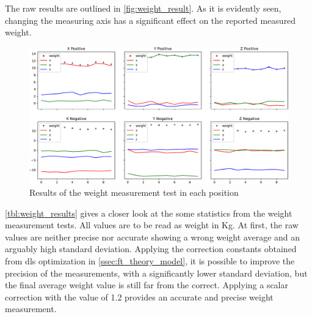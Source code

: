 \par The raw results are outlined in \autoref{fig:weight_result}. As it is evidently seen, changing the measuring axis has a significant effect on the reported measured weight.

\begin{figure}[h]
    \centering
    \includegraphics[width=0.8\linewidth]{figs/chp6/weight_measurements.pdf}
    \caption{Results of the weight measurement test in each position}
    \label{fig:weight_result}
\end{figure}

\par \autoref{tbl:weight_results} gives a closer look at the some statistics from the weight measurement tests. All values are to be read as weight in Kg. At first, the raw values are neither precise nor accurate showing a wrong weight average and an arguably high standard deviation. Applying the correction constants obtained from \ac{dls} optimization in \autoref{ssec:ft_theory_model}, it is possible to improve the precision of the measurements, with a significantly lower standard deviation, but the final average weight value is still far from the correct. Applying a scalar correction with the value of 1.2 provides an accurate and precise weight measurement.

